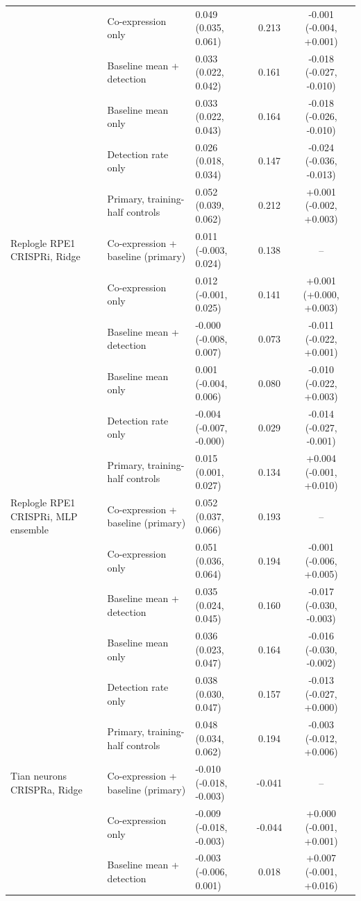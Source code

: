 \begin{tabular}{lllcc}
 & Co-expression only & 0.049 (0.035, 0.061) & 0.213 & -0.001 (-0.004, +0.001) \\
 & Baseline mean + detection & 0.033 (0.022, 0.042) & 0.161 & -0.018 (-0.027, -0.010) \\
 & Baseline mean only & 0.033 (0.022, 0.043) & 0.164 & -0.018 (-0.026, -0.010) \\
 & Detection rate only & 0.026 (0.018, 0.034) & 0.147 & -0.024 (-0.036, -0.013) \\
 & Primary, training-half controls & 0.052 (0.039, 0.062) & 0.212 & +0.001 (-0.002, +0.003) \\
Replogle RPE1 CRISPRi, Ridge & Co-expression + baseline (primary) & 0.011 (-0.003, 0.024) & 0.138 & -- \\
 & Co-expression only & 0.012 (-0.001, 0.025) & 0.141 & +0.001 (+0.000, +0.003) \\
 & Baseline mean + detection & -0.000 (-0.008, 0.007) & 0.073 & -0.011 (-0.022, +0.001) \\
 & Baseline mean only & 0.001 (-0.004, 0.006) & 0.080 & -0.010 (-0.022, +0.003) \\
 & Detection rate only & -0.004 (-0.007, -0.000) & 0.029 & -0.014 (-0.027, -0.001) \\
 & Primary, training-half controls & 0.015 (0.001, 0.027) & 0.134 & +0.004 (-0.001, +0.010) \\
Replogle RPE1 CRISPRi, MLP ensemble & Co-expression + baseline (primary) & 0.052 (0.037, 0.066) & 0.193 & -- \\
 & Co-expression only & 0.051 (0.036, 0.064) & 0.194 & -0.001 (-0.006, +0.005) \\
 & Baseline mean + detection & 0.035 (0.024, 0.045) & 0.160 & -0.017 (-0.030, -0.003) \\
 & Baseline mean only & 0.036 (0.023, 0.047) & 0.164 & -0.016 (-0.030, -0.002) \\
 & Detection rate only & 0.038 (0.030, 0.047) & 0.157 & -0.013 (-0.027, +0.000) \\
 & Primary, training-half controls & 0.048 (0.034, 0.062) & 0.194 & -0.003 (-0.012, +0.006) \\
Tian neurons CRISPRa, Ridge & Co-expression + baseline (primary) & -0.010 (-0.018, -0.003) & -0.041 & -- \\
 & Co-expression only & -0.009 (-0.018, -0.003) & -0.044 & +0.000 (-0.001, +0.001) \\
 & Baseline mean + detection & -0.003 (-0.006, 0.001) & 0.018 & +0.007 (-0.001, +0.016) \\

\end{tabular}
